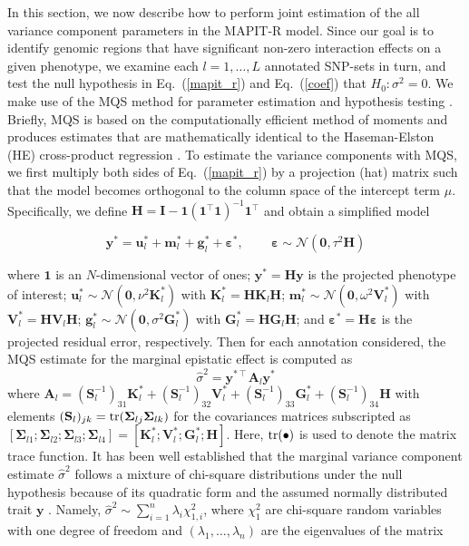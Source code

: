 \documentclass[10pt,a4paper]{article}
\def\eq#1{(\ref{#1})}
\def\tr{{\rm tr}}
\newcommand{\bg}{\mathbf{g}}
\newcommand{\by}{\mathbf{y}}
\newcommand{\bu}{\mathbf{u}}
\newcommand{\bfm}{\mathbf{m}}
\newcommand{\bK}{\mathbf{K}}
\newcommand{\bV}{\mathbf{V}}
\newcommand{\bA}{\mathbf{A}}
\newcommand{\bG}{\mathbf{G}}
\newcommand{\bH}{\mathbf{H}}
\newcommand{\bI}{\mathbf{I}}
\newcommand{\bS}{\mathbf{S}}
\newcommand{\T}{\intercal}
\newcommand{\wh}{\widehat}
\newcommand{\N}{\mathcal{N}}
\newcommand{\bvarepsilon}{\boldsymbol\varepsilon}
\newcommand{\bSigma}{\boldsymbol\Sigma}
\begin{document}
In this section, we now describe how to perform joint estimation of the all variance component parameters in the MAPIT-R model. Since our goal is to identify genomic regions that have significant non-zero interaction effects on a given phenotype, we examine each $l = 1,\ldots, L$ annotated SNP-sets in turn, and test the null hypothesis in Eq.~\eq{mapit_r} and Eq.~\eq{coef} that $H_0: \sigma^2=0$. We make use of the MQS method for parameter estimation and hypothesis testing \cite{Zhou2017}. Briefly, MQS is based on the computationally efficient method of moments and produces estimates that are mathematically identical to the Haseman-Elston (HE) cross-product regression \cite{Haseman1972}. To estimate the variance components with MQS, we first multiply both sides of Eq.~\eq{mapit_r} by a projection (hat) matrix such that the model becomes orthogonal to the column space of the intercept term $\mu$. Specifically, we define $\bH=\bI-\bm{1}(\bm{1}^{\T}\bm{1})^{-1}\bm{1}^{\T}$ and obtain a simplified model
\begin{linenomath*}
\begin{equation}
\by^* = \bu_l^* + \bfm_l^* + \bg_l^* +\bvarepsilon^*, \quad \, \quad  \bvarepsilon\sim \N(\bm{0},\tau^2\bH)\label{mapit_r2}
\end{equation}
\end{linenomath*}
where $\bm{1}$ is an $N$-dimensional vector of ones; $\by^* = \bH\by$ is the projected phenotype of interest; $\bu_l^*\sim \N(\bm{0},\nu^2\bK_l^*)$ with $\bK_l^* = \bH\bK_l\bH$; $\bfm_l^*\sim \N(\bm{0},\omega^2\bV_l^*)$ with $\bV_l^* = \bH\bV_l\bH$; $\bg_l^*\sim \N(\bm{0},\sigma^2\bG_l^*)$ with $\bG_l^* = \bH\bG_l\bH$; and $\bvarepsilon^* = \bH\bvarepsilon$ is the projected residual error, respectively. Then for each annotation considered, the MQS estimate for the marginal epistatic effect is computed as
\begin{equation}
\wh\sigma^2 = \by^{*\T}\bA_l\by^*
\end{equation}
where $\bA_{l} = (\bS_l^{-1})_{31}\bK_l^*+(\bS_l^{-1})_{32}\bV_l^*+(\bS_l^{-1})_{33}\bG^*_l+(\bS_l^{-1})_{34}\bH$ with elements $(\bS_l)_{jk} = \tr(\bSigma_{lj} \bSigma_{lk})$ for the covariances matrices subscripted as $[\bSigma_{l1}; \bSigma_{l2}; \bSigma_{l3}; \bSigma_{l4}]  = [\bK^*_l; \bV^*_l; \bG^*_l; \bH]$. Here, $\tr(\bullet)$ is used to denote the matrix trace function. It has been well established that the marginal variance component estimate $\wh\sigma^2$ follows a mixture of chi-square distributions under the null hypothesis because of its quadratic form and the assumed normally distributed trait $\by$ \cite{Liu:2010aa,Wu2011,Lee:2012aa,Ionita-Laza:2013aa,Crawford2017a,Wang:2017aa}. Namely, $\wh\sigma^2 \sim \sum_{i=1}^{n}\lambda_{i}\chi^2_{1,i}$, where $\chi^2_{1}$ are chi-square random variables with one degree of freedom and $(\lambda_{1},\ldots,\lambda_{n})$ are the eigenvalues of the matrix \cite{Crawford2017a,Zhou2017}
\end{document}
